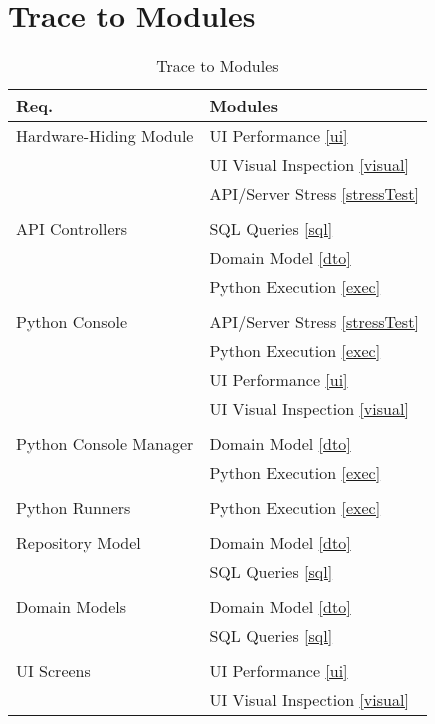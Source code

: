 \documentclass[12pt, titlepage]{article}
\begin{document}
\clearpage
		
\section{Trace to Modules}		

\begin{table}
\centering
\begin{tabular}{p{} p{}}
\toprule
\textbf{Req.} & \textbf{Modules}\\
\midrule
	Hardware-Hiding Module & UI Performance \ref{ui}\\
				 & UI Visual Inspection \ref{visual}\\
				 & API/Server Stress \ref{stressTest}\\
	\\API Controllers & SQL Queries \ref{sql}\\
				 & Domain Model \ref{dto}\\
				 & Python Execution \ref{exec}\\
	\\Python Console & API/Server Stress \ref{stressTest}\\
				 & Python Execution \ref{exec}\\
				 & UI Performance \ref{ui}\\
				 & UI Visual Inspection \ref{visual}\\
	\\Python Console Manager & Domain Model \ref{dto}\\
				 & Python Execution \ref{exec}\\
	\\Python Runners & Python Execution \ref{exec}\\
	\\Repository Model & Domain Model \ref{dto}\\
				 & SQL Queries \ref{sql}\\
	\\Domain Models & Domain Model \ref{dto}\\
				 & SQL Queries \ref{sql}\\
	\\UI Screens & UI Performance \ref{ui}\\
				 & UI Visual Inspection \ref{visual}\\
\bottomrule
\end{tabular}
\caption{Trace to Modules }
\label{TblRT}
\end{table}

\newpage
\end{document}
